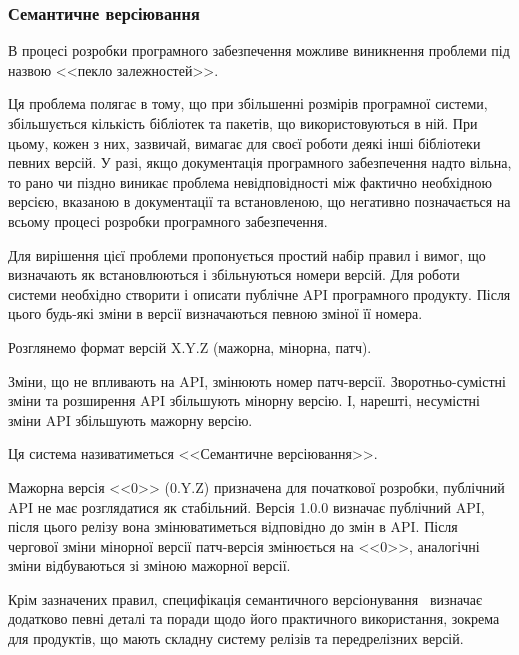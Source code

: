 \subsubsection{Семантичне версіювання} \label{subs:semver}

В процесі розробки програмного забезпечення можливе виникнення проблеми під назвою <<пекло залежностей>>. 

Ця проблема полягає в тому, що при збільшенні розмірів програмної системи, збільшується кількість бібліотек та пакетів, що використовуються в ній. При цьому, кожен з них, зазвичай, вимагає для своєї роботи деякі інші бібліотеки певних версій. У разі, якщо документація програмного забезпечення надто вільна, то рано чи піздно виникає проблема невідповідності між фактично необхідною версією, вказаною в документації та встановленою, що негативно позначається на всьому процесі розробки програмного забезпечення.

Для вирішення цієї проблеми пропонується простий набір правил і вимог, що визначають як встановлюються і збільнуються номери версій. Для роботи системи необхідно створити і описати публічне API програмного продукту. Після цього будь-які зміни в версії визначаються певною зміної її номера.

Розглянемо формат версій X.Y.Z (мажорна, мінорна, патч).

Зміни, що не впливають на API, змінюють номер патч-версії. Зворотньо-сумістні зміни та розширення API збільшують мінорну версію. І, нарешті, несумістні зміни API збільшують мажорну версію.

Ця система називатиметься <<Семантичне версіювання>>.

Мажорна версія <<0>> (0.Y.Z) призначена для початкової розробки, публічний API не має розглядатися як стабільний. Версія 1.0.0 визначає публічний API, після цього релізу вона змінюватиметься відповідно до змін в API. Після чергової зміни мінорної версії патч-версія змінюється на <<0>>, аналогічні зміни відбуваються зі зміною мажорної версії.

Крім зазначених правил, специфікація семантичного версіонування~\cite{semver} визначає додатково певні деталі та поради щодо його практичного використання, зокрема для продуктів, що мають складну систему релізів та передрелізних версій.
